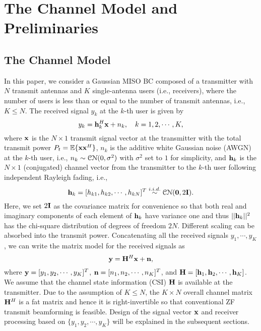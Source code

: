 \documentclass[11pt, draft, onecolumn ]{IEEEtran}
\begin{document}
\section{The Channel Model and Preliminaries}




\subsection{The Channel Model}  \label{subsec:ChannelModel}



In this paper, we consider a Gaussian MISO BC composed of a transmitter with $N$ transmit antennas and $K$ single-antenna users (i.e., receivers), where the number of users is less than or equal to the number of transmit antennas, i.e., $K \le N$. The received signal $y_k$ at the $k$-th user is given by
\begin{equation}  \label{eq:channelModel}
y_k = {\bf h}_k^H {\bf x} + n_k, ~~~k=1,2,\cdots, K,
\end{equation}
where ${\bf x}$ is the $N\times 1$ transmit signal vector at the transmitter with the total transmit power $P_t = {\mathbb{E}} \{ {\bf x}{\bf x}^H\}$, $n_k$ is the additive white Gaussian noise (AWGN) at the $k$-th user, i.e., $n_k \sim {\cal C}{\cal N}(0,\sigma^2)$ with $\sigma^2$ set to $1$ for simplicity, and ${\bf h}_k$ is the $N \times 1$ (conjugated) channel vector from the transmitter to the $k$-th user following independent Rayleigh fading, i.e.,
\begin{equation}  \label{eq:hbfkinmodel}
{\bf h}_k=[h_{k1},h_{k2},\cdots,h_{kN}]^T \stackrel{i.i.d.}{\sim} {\cal C}{\cal N}(\mathbf{0}, 2{\bf I}).
\end{equation}
Here, we set $2{\bf I}$ as the covariance matrix for convenience  so that both real and imaginary components of each element of ${\bf h}_k$ have variance one and thus $||{\bf h}_k||^2$ has the chi-square distribution of degrees of freedom $2 N$.
Different scaling can be absorbed into the transmit power.
Concatenating all the received signals $y_1,\cdots,y_K$, we can write the matrix model for the received signals as
\begin{equation}
{\bf y} = {\bf H}^H {\bf x} + {\bf n},
\end{equation}
where ${\bf y}=[y_1,y_2,\cdots,y_K]^T$, ${\bf n}=[n_1,n_2,\cdots,n_K]^T$, and
${\bf H} = [{\bf h}_1,{\bf h}_2,\cdots,{\bf h}_K]$.
{}{We assume that the channel state information (CSI) ${\bf H}$ is available at the transmitter.}
Due to the assumption of $K \le N$, the $K\times N$ overall channel matrix ${\bf H}^H$ is a fat  matrix and hence it is right-invertible so that conventional ZF transmit beamforming is feasible.
Design of the signal vector ${\bf x}$ and receiver processing based on $\{y_1,y_2,\cdots,y_K\}$ will be explained in the subsequent sections.
\end{document}
